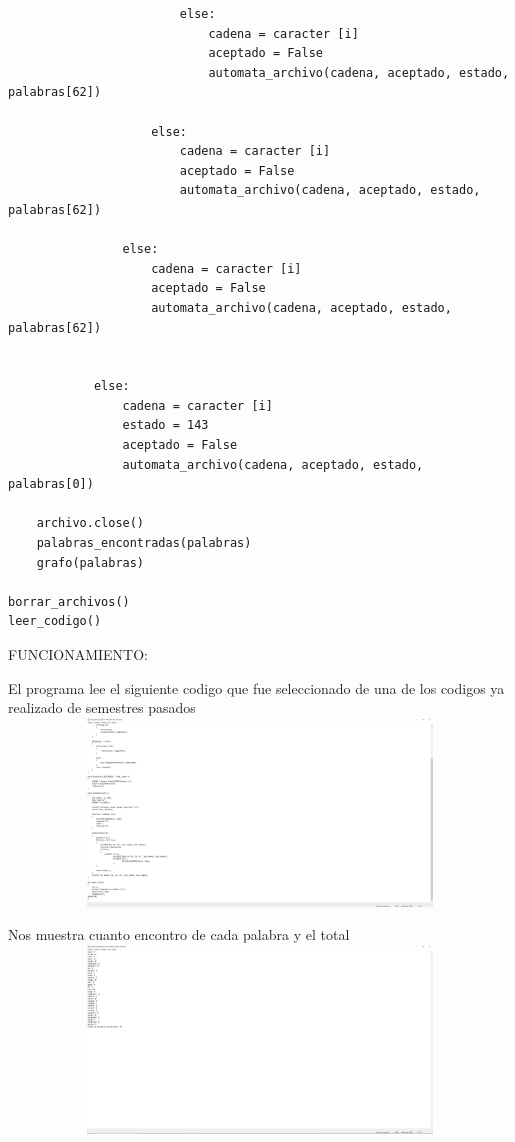 \documentclass{article}
\begin{document}
\begin{flushleft}
\begin{lstlisting}
                        else:
                            cadena = caracter [i]
                            aceptado = False
                            automata_archivo(cadena, aceptado, estado, palabras[62])
                            
                    else:
                        cadena = caracter [i]
                        aceptado = False
                        automata_archivo(cadena, aceptado, estado, palabras[62])
                    
                else:
                    cadena = caracter [i]
                    aceptado = False
                    automata_archivo(cadena, aceptado, estado, palabras[62])
                    
                    
            else:
                cadena = caracter [i]
                estado = 143
                aceptado = False
                automata_archivo(cadena, aceptado, estado, palabras[0])
                
    archivo.close()
    palabras_encontradas(palabras)
    grafo(palabras)

borrar_archivos()
leer_codigo()

\end{lstlisting}

FUNCIONAMIENTO:

El programa lee el siguiente codigo que fue seleccionado de una de los codigos ya realizado de semestres pasados
\includegraphics[width= 15cm, height= 5cm]{p3ar1.png}

Nos muestra cuanto encontro de cada palabra y el total
\includegraphics[width= 15cm, height= 5cm]{p3ar2.png}


\end{flushleft}
\end{document}
